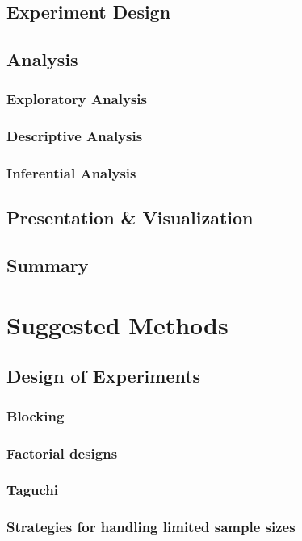\documentclass[11pt,a4paper,article]{memoir} %
\begin{document}
\section{Experiment Design}

\section{Analysis}
\subsection{Exploratory Analysis}
\subsection{Descriptive Analysis}
\subsection{Inferential Analysis}

\section{Presentation \& Visualization}

\section{Summary}

\chapter{Suggested Methods}
\section{Design of Experiments}
\subsection{Blocking}

\subsection{Factorial designs}

\subsection{Taguchi}

\subsection{Strategies for handling limited sample sizes}
\end{document}

